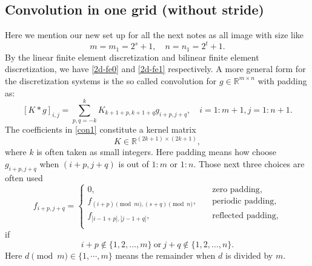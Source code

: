 \subsection{Convolution in one grid (without stride)}
Here we mention our new set up for all the next notes as all image with
size like 
\begin{equation}\label{eq:size_f}
m = m_1 = 2^{s} + 1,  \quad n = n_1 = 2^t  +1.
\end{equation}
By the linear finite element discretization and bilinear finite element discretization, 
we have \eqref{2d-fe0} and \eqref{2d-fe1} respectively. 
A more general form for the discretization systems  is the so 
called convolution for $ g \in \mathbb{R}^{m\times n}$ with padding as:
\begin{equation}\label{con1}
[K \ast g]_{i,j} = \sum_{p,q=-k}^k K_{k+1+p,k+1+q} g_{i + p, j + q}, \quad i=1:m + 1, j = 1:n + 1.
\end{equation}
The coefficients in \eqref{con1} constitute  a kernel matrix
\begin{equation}
K \in \mathbb{R}^{(2k+1) \times (2k+1)},
\end{equation}
where $k$ is often taken as small integers. 
Here padding means how choose $ g_{i+ p, j + q}$ 
when $(i+ p, j + q)$ is out of $1:m$ or $1:n$. 
Those next three choices are often used
\begin{equation}\label{eq:padding}
f_{i + p, j + q} = \begin{cases}
0,  \quad &\text{zero padding}, \\
f_{(i + p)\pmod{m}, (s + q)\pmod{n}},  \quad &\text{periodic padding}, \\
f_{|i-1 +p|, |j -1  +q|},  \quad &\text{reflected padding}, \\
\end{cases}
\end{equation}
if 
\begin{equation}
i + p \notin \{1, 2, \dots, m\} ~\text{or} ~  j+ q \notin \{1, 2, \dots, n\}.
\end{equation}
Here $ d \pmod{m} \in \{1, \cdots, m\} $  means the remainder when $d$ is divided by $m$.

